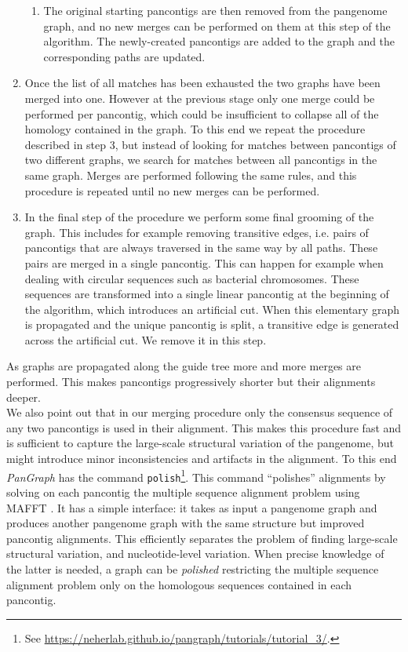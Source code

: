 \documentclass[aps,rmp,reprint,superscriptaddress,notitlepage,10pt,onecolumn]{revtex4-1}
\begin{document}
\begin{enumerate}
\begin{enumerate}
              \item The original starting pancontigs are then removed from the pangenome graph, and no new merges can be performed on them at this step of the algorithm. The newly-created pancontigs are added to the graph and the corresponding paths are updated.
          \end{enumerate}
    \item Once the list of all matches has been exhausted the two graphs have been merged into one. However at the previous stage only one merge could be performed per pancontig, which could be insufficient to collapse all of the homology contained in the graph. To this end we repeat the procedure described in step 3, but instead of looking for matches between pancontigs of two different graphs, we search for matches between all pancontigs in the same graph. Merges are performed following the same rules, and this procedure is repeated until no new merges can be performed.
    \item In the final step of the procedure we perform some final grooming of the graph. This includes for example removing transitive edges, i.e. pairs of pancontigs that are always traversed in the same way by all paths. These pairs are merged in a single pancontig. This can happen for example when dealing with circular sequences such as bacterial chromosomes. These sequences are transformed into a single linear pancontig at the beginning of the algorithm, which introduces an artificial cut. When this elementary graph is propagated and the unique pancontig is split, a transitive edge is generated across the artificial cut. We remove it in this step.
\end{enumerate}

As graphs are propagated along the guide tree more and more merges are performed. This makes pancontigs progressively shorter but their alignments deeper.\\
We also point out that in our merging procedure only the consensus sequence of any two pancontigs is used in their alignment. This makes this procedure fast and is sufficient to capture the large-scale structural variation of the pangenome, but might introduce minor inconsistencies and artifacts in the alignment. To this end \textit{PanGraph} has the command \verb|polish|\footnote{See \url{https://neherlab.github.io/pangraph/tutorials/tutorial_3/}.}. This command ``polishes'' alignments by solving on each pancontig the multiple sequence alignment problem using MAFFT \cite{katoh2002mafft}. It has a simple interface: it takes as input a pangenome graph and produces another pangenome graph with the same structure but improved pancontig alignments. This efficiently separates the problem of finding large-scale structural variation, and nucleotide-level variation. When precise knowledge of the latter is needed, a graph can be \textit{polished} restricting the multiple sequence alignment problem only on the homologous sequences contained in each pancontig.
\end{document}
